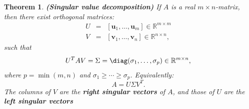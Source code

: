 \documentclass[a4paper,11pt]{report}
\newtheorem{theorem}{Theorem}[section]
\newcommand{\R}{{\mathbb R}}
\begin{document}
\begin{theorem} \textbf{(Singular value decomposition)}
If $A$ is a real $m \times n$-matrix, then there exist orthogonal matrices:
\begin{eqnarray*}
  U &=& [\mathbf{u}_1,\ldots, \mathbf{u}_m] \in \R^{m\times m}\\
  V &=& [\mathbf{v}_1,\ldots, \mathbf{v}_n] \in \R^{n\times n},
\end{eqnarray*}
such that
$$U^TAV = \Sigma = \diag(\sigma_1,\ldots,\sigma_p) \in \R^{m \times n},$$
where $p = \min(m,n)$ and $\sigma_1 \geq \cdots \geq \sigma_p$. 
Equivalently:
$$A = U\Sigma V^T.$$
The columns of $V$ are the \textbf{right singular vectors} of $A$, and those of $U$ 
are the \textbf{left singular vectors}
\end{theorem}
\end{document}
